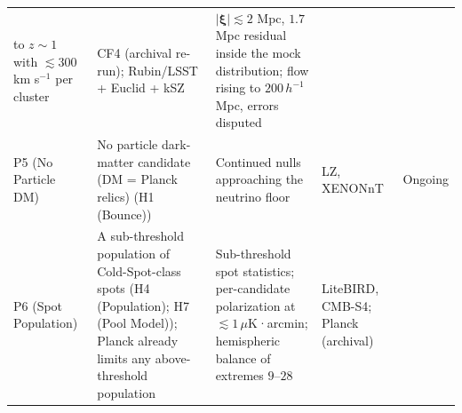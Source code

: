 \documentclass[
]{article}
\begin{document}
\begin{longtable}[]{@{}lllll@{}}
\begin{minipage}[t]{0.19\columnwidth}
to \(z \sim 1\) with \(\lesssim 300\) km s\(^{-1}\) per cluster\strut
\end{minipage} & \begin{minipage}[t]{0.19\columnwidth}\raggedright
CF4 (archival re-run); Rubin/LSST + Euclid + kSZ\strut
\end{minipage} & \begin{minipage}[t]{0.19\columnwidth}\raggedright
\(|\boldsymbol{\xi}| \lesssim 2\) Mpc, \(1.7\) Mpc residual inside the
mock distribution; flow rising to \(200\,h^{-1}\) Mpc, errors
disputed\strut
\end{minipage}\tabularnewline
\begin{minipage}[t]{0.11\columnwidth}\raggedright
P5 (No Particle DM)\strut
\end{minipage} & \begin{minipage}[t]{0.19\columnwidth}\raggedright
No particle dark-matter candidate (DM = Planck relics) (H1
(Bounce))\strut
\end{minipage} & \begin{minipage}[t]{0.19\columnwidth}\raggedright
Continued nulls approaching the neutrino floor\strut
\end{minipage} & \begin{minipage}[t]{0.19\columnwidth}\raggedright
LZ, XENONnT\strut
\end{minipage} & \begin{minipage}[t]{0.19\columnwidth}\raggedright
Ongoing\strut
\end{minipage}\tabularnewline
\begin{minipage}[t]{0.11\columnwidth}\raggedright
P6 (Spot Population)\strut
\end{minipage} & \begin{minipage}[t]{0.19\columnwidth}\raggedright
A sub-threshold population of Cold-Spot-class spots (H4 (Population); H7
(Pool Model)); Planck already limits any above-threshold
population\strut
\end{minipage} & \begin{minipage}[t]{0.19\columnwidth}\raggedright
Sub-threshold spot statistics; per-candidate polarization at
\(\lesssim 1\,\mu\)K·arcmin; hemispheric balance of extremes
\(9\)--\(28\)\strut
\end{minipage} & \begin{minipage}[t]{0.19\columnwidth}\raggedright
LiteBIRD, CMB-S4; Planck (archival)\strut
\end{minipage} & \begin{minipage}[t]{0.19\columnwidth}\raggedright

\end{minipage}
\end{longtable}
\end{document}
